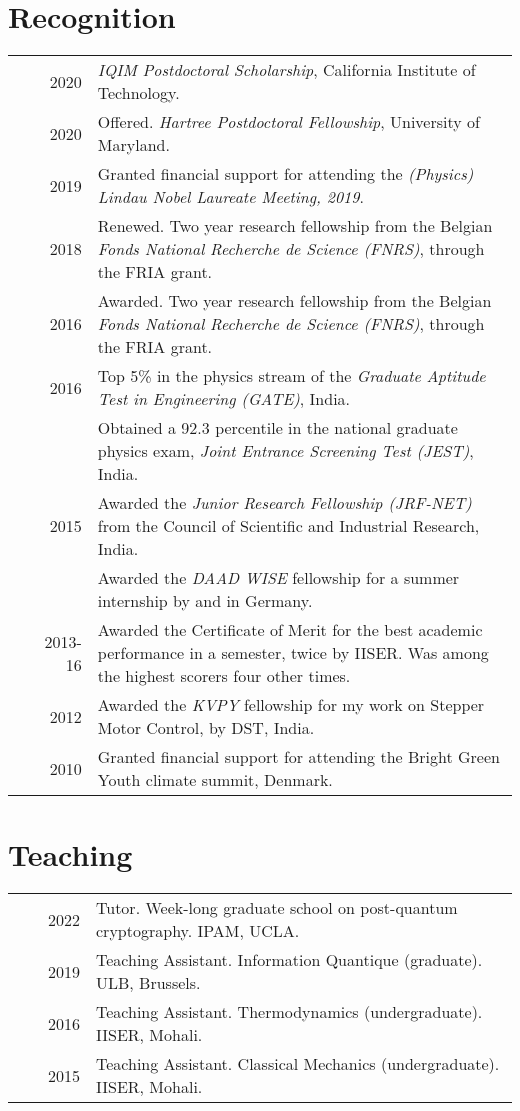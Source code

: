\documentclass[a4paper,10pt]{article}
\begin{document}
\section{Recognition }
\begin{tabular}{rrp{11cm}}
  & ~~2020 & \emph{IQIM Postdoctoral Scholarship}, California Institute of Technology. \\
  & ~~2020 & Offered. \emph{Hartree Postdoctoral Fellowship}, University of Maryland.\\  
  & ~~2019 & Granted financial support for attending the \emph{(Physics) Lindau Nobel Laureate Meeting, 2019}. \\
  & ~~2018 & Renewed. Two year research fellowship from the Belgian \emph{Fonds National Recherche de Science (FNRS)}, through the FRIA grant.\normalsize\\
  & ~~2016 & Awarded. Two year research fellowship from the Belgian \emph{Fonds National Recherche de Science (FNRS)}, through the FRIA grant.\normalsize\\
 & ~~2016     & Top 5\% in the physics stream of the \emph{Graduate Aptitude Test in Engineering (GATE)}, India. \\
 & ~~~~~~     & Obtained a 92.3 percentile in the national graduate physics exam, \emph{Joint Entrance Screening Test (JEST)}, India. \\

 & ~~2015     & Awarded the \emph{Junior Research Fellowship (JRF-NET)} from the Council of Scientific and Industrial Research, India. \\
 & ~~~~~~     & Awarded the \emph{DAAD WISE} fellowship for a summer internship by and in Germany.\\
 & 2013-16  & Awarded the Certificate of Merit for the best academic performance in a semester, twice by IISER. Was among the highest scorers four other times.\\
 & ~~2012     & Awarded the \emph{KVPY} fellowship for my work on Stepper Motor Control, by DST, India.\\
 & ~~2010     & Granted financial support for attending the Bright Green Youth climate summit, Denmark.
\end{tabular}


  \section{Teaching}
  \begin{tabular}{rrp{11cm}}
  & ~~2022 &Tutor. Week-long graduate school on post-quantum cryptography. IPAM, UCLA.\\
  & ~~2019 &Teaching Assistant. Information Quantique (graduate). ULB, Brussels.\\  
  & ~~2016 &Teaching Assistant. Thermodynamics (undergraduate). IISER, Mohali.\\
  & ~~2015 &Teaching Assistant. Classical Mechanics (undergraduate). IISER, Mohali.
  \end{tabular}
\end{document}
